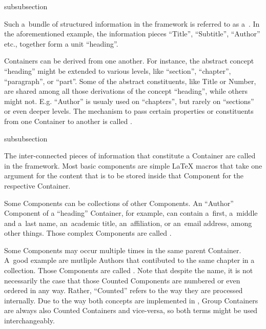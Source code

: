 \begin{Heading}[label=sec:overview.containers]{subsubsection}
\end{Heading}

Such a~bundle of structured information in the {\CoCoTeX} framework is
referred to as a~. In the
aforementioned example, the information pieces “Title”, “Subtitle”,
“Author” etc., together form a unit “heading”.

Containers can be derived from one another. For instance, the abstract
concept “heading” might be extended to various levels, like “section”,
“chapter”, “paragraph”, or “part”. Some of the abstract constituents,
like Title or Number, are shared among all those derivations of the
concept “heading”, while others might not. E.g. “Author” is usualy
used on “chapters”, but rarely on “sections” or even deeper
levels. The mechanism to pass certain properties or constituents from
one Container to another is called
.

\begin{Heading}[label=sec:overview.components]{subsubsection}
\end{Heading}

The inter-connected pieces of information that constitute a Container
are called  in the
{\CoCoTeX} framework. Most basic components are simple {\LaTeX} macros
that take one argument for the content that is to be stored inside
that Component for the respective Container.

Some Components can be collections of other Components. An “Author”
Component of a “heading” Container, for example, can contain a~first,
a~middle and a~last name, an~academic title, an~affiliation, or
an~email address, among other things. Those complex Components are
called .

Some Components may occur multiple times in the same parent
Container. A~good example are mutliple Authors that contibuted to the
same chapter in a collection. Those Components are called
. Note that
despite the name, it is not necessarily the case that those Counted
Components are numbered or even ordered in any way. Rather,
``Counted'' refers to the way they are processed internally. Due to
the way both concepts are implemented in {\CoCoTeX}, Group Containers
are always also Counted Containers and vice-versa, so both terms might
be used interchangeably.

